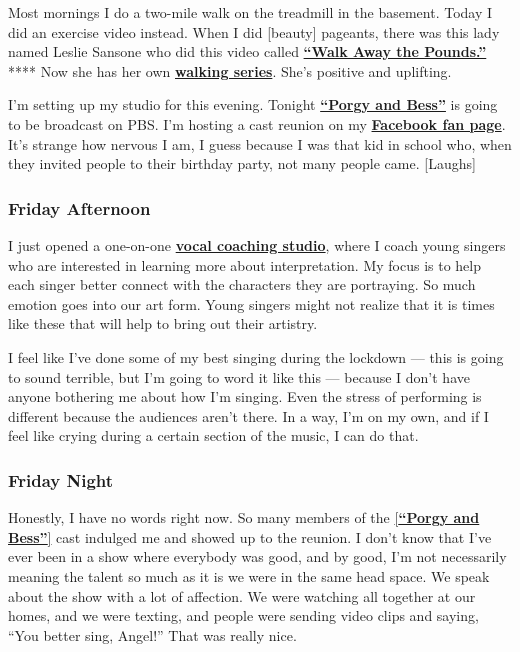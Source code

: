 Most mornings I do a two-mile walk on the treadmill in the basement.
Today I did an exercise video instead. When I did {[}beauty{]} pageants,
there was this lady named Leslie Sansone who did this video called
\textbf{\href{https://www.youtube.com/watch?v=ECxnTuzZ614}{``Walk Away
the Pounds.''}} **** Now she has her own
\textbf{\href{https://walkathome.com/}{walking series}}. She's positive
and uplifting.

I'm setting up my studio for this evening. Tonight
\textbf{\href{https://www.pbs.org/wnet/gperf/gp-at-the-met-porgy-and-bess-about-the-opera/11582/}{``Porgy
and Bess''}} is going to be broadcast on PBS. I'm hosting a cast reunion
on my
\textbf{\href{https://www.facebookcorewwwi.onion/angeljoyblue/}{Facebook
fan page}}. It's strange how nervous I am, I guess because I was that
kid in school who, when they invited people to their birthday party, not
many people came. {[}Laughs{]}

\hypertarget{friday-afternoon}{%
\subsubsection{\texorpdfstring{\textbf{Friday
Afternoon}}{Friday Afternoon}}\label{friday-afternoon}}

I just opened a one-on-one \textbf{\href{http://angeljoyblue.com/}{vocal
coaching studio}}, where I coach young singers who are interested in
learning more about interpretation. My focus is to help each singer
better connect with the characters they are portraying. So much emotion
goes into our art form. Young singers might not realize that it is times
like these that will help to bring out their artistry.

I feel like I've done some of my best singing during the lockdown ---
this is going to sound terrible, but I'm going to word it like this ---
because I don't have anyone bothering me about how I'm singing. Even the
stress of performing is different because the audiences aren't there. In
a way, I'm on my own, and if I feel like crying during a certain section
of the music, I can do that.

\hypertarget{friday-night}{%
\subsubsection{\texorpdfstring{\textbf{Friday
Night}}{Friday Night}}\label{friday-night}}

Honestly, I have no words right now. So many members of the
\href{https://www.metopera.org/user-information/old-seasons/2019-20/2019-20-season/porgy-and-bess/}{{[}}\textbf{\href{https://www.metopera.org/user-information/old-seasons/2019-20/2019-20-season/porgy-and-bess/}{``Porgy
and
Bess''}}\href{https://www.metopera.org/user-information/old-seasons/2019-20/2019-20-season/porgy-and-bess/}{{]}}
cast indulged me and showed up to the reunion. I don't know that I've
ever been in a show where everybody was good, and by good, I'm not
necessarily meaning the talent so much as it is we were in the same head
space. We speak about the show with a lot of affection. We were watching
all together at our homes, and we were texting, and people were sending
video clips and saying, ``You better sing, Angel!'' That was really
nice.

